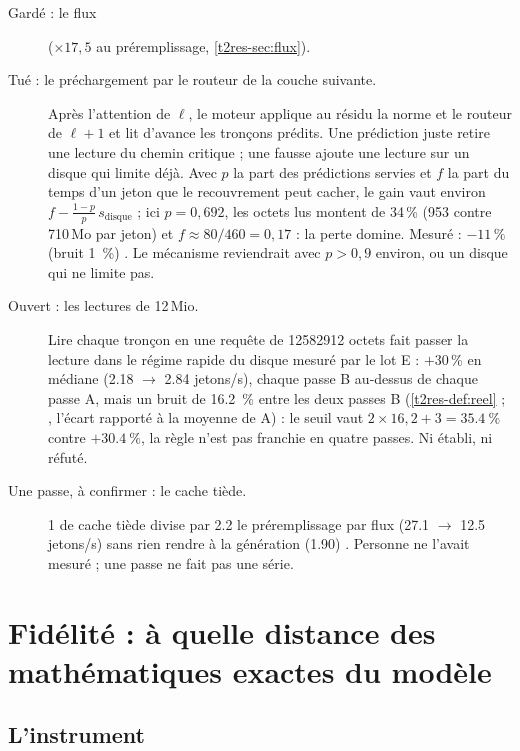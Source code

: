 \begin{description}
\item[Gardé : le flux] ($\times 17{,}5$ au préremplissage, \cref{t2res-sec:flux}).
\item[Tué : le préchargement par le routeur de la couche suivante.] Après l'attention de $\ell$, le moteur applique au résidu la norme et le routeur de $\ell+1$ et lit d'avance les tronçons prédits. Une prédiction juste retire une lecture du chemin critique ; une fausse ajoute une lecture sur un disque qui limite déjà. Avec $p$ la part des prédictions servies et $f$ la part du temps d'un jeton que le recouvrement peut cacher, le gain vaut environ $f - \frac{1-p}{p}\,s_{\text{disque}}$ ; ici $p = 0{,}692$, les octets lus montent de \num{34}\,\% (953 contre 710\,Mo par jeton) et $f \approx 80/460 = 0{,}17$ : la perte domine. Mesuré : $-11\,\%$ (bruit \SI{1}{\percent}) \mes. Le mécanisme reviendrait avec $p > 0{,}9$ environ, ou un disque qui ne limite pas.
\item[Ouvert : les lectures de 12\,Mio.] Lire chaque tronçon en une requête de \num{12582912} octets fait passer la lecture dans le régime rapide du disque mesuré par le lot E : $+30\,\%$ en médiane (\num{2.18} $\to$ \num{2.84} jetons/s), chaque passe B au-dessus de chaque passe A, mais un bruit de \SI{16.2}{\percent} entre les deux passes B (\cref{t2res-def:reel} ; , l'écart rapporté à la moyenne de A) : le seuil vaut $2 \times 16{,}2 + 3 = \SI{35.4}{\percent}$ contre $+\SI{30.4}{\percent}$, la règle n'est pas franchie en quatre passes. Ni établi, ni réfuté.
\item[Une passe, à confirmer : le cache tiède.] \SI{1}{\Go} de cache tiède divise par \num{2.2} le préremplissage par flux (\num{27.1} $\to$ \num{12.5} jetons/s) sans rien rendre à la génération (\num{1.90}) \mes. Personne ne l'avait mesuré ; une passe ne fait pas une série.
\end{description}

\section{Fidélité : à quelle distance des mathématiques exactes du modèle}\label{t2res-sec:fidelite}

\subsection{L'instrument}

